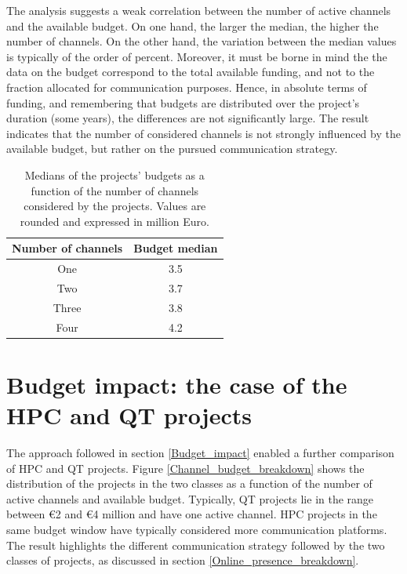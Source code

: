 The analysis suggests a weak correlation between the number of active channels and the available budget. On one hand, the larger the median, the higher the number of channels. On the other hand, the variation between the median values is typically of the order of percent. Moreover, it must be borne in mind the the data on the budget correspond to the total available funding, and not to the fraction allocated for communication purposes. Hence, in absolute terms of funding, and remembering that budgets are distributed over the project's duration (some years), the differences are not significantly large. The result indicates that the number of considered channels is not strongly influenced by the available budget, but rather on the pursued communication strategy. 

\begin{table}[t]
 \begin{center}
  \begin{tabular}{cc}
   \hline 
   \hline
   Number of channels & Budget median \\ 
   \hline
   \hline
   One & 3.5 \\
   Two & 3.7 \\
   Three & 3.8 \\
   Four & 4.2 \\
   \hline
   \hline
  \end{tabular}
 \end{center} 
 \caption{Medians of the projects' budgets as a function of the number of channels considered by the projects. Values are rounded and expressed in million Euro.}
\label{Median} 
\end{table}

\section{Budget impact: the case of the HPC and QT projects} \label{Budget_impact_the_case_of_the_HPC_and_QT_projects}
The approach followed in section \ref{Budget_impact} enabled a further comparison of HPC and QT projects. Figure \ref{Channel_budget_breakdown} shows the distribution of the projects in the two classes as a function of the number of active channels and available budget. Typically, QT projects lie in the range between \euro 2 and \euro 4 million and have one active channel. HPC projects in the same budget window have typically considered more communication platforms. The result highlights the different communication strategy followed by the two classes of projects, as discussed in section \ref{Online_presence_breakdown}. 

